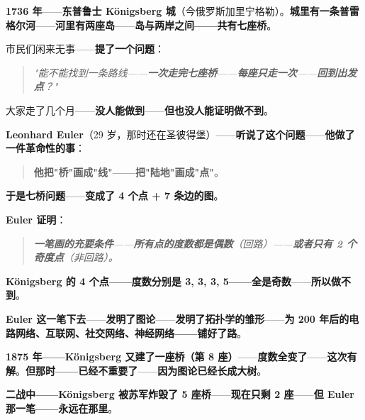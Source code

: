 \begin{tcolorbox}[storybox={\Large 小故事：Euler 与 Königsberg 七桥（1736）}]
\textbf{1736 年}——\textbf{东普鲁士 Königsberg 城}（今俄罗斯加里宁格勒）。\textbf{城里有一条普雷格尔河}——\textbf{河里有两座岛}——\textbf{岛与两岸之间——\textbf{共有七座桥}}。

\medskip

市民们闲来无事——\textbf{提了一个问题}：

\begin{quote}\itshape
"能不能找到一条路线——\textbf{一次走完七座桥}——\textbf{每座只走一次}——\textbf{回到出发点}？"
\end{quote}

大家走了几个月——\textbf{没人能做到}——\textbf{但也没人能证明做不到}。

\medskip

\textbf{Leonhard Euler}（29 岁，那时还在圣彼得堡）——\textbf{听说了这个问题}——\textbf{他做了一件革命性的事}：

\begin{quote}
\textbf{他把"桥"画成"线"——\textbf{把"陆地"画成"点"}}。
\end{quote}

\textbf{于是七桥问题}——\textbf{变成了 4 个点 + 7 条边的图}。

\medskip

\textbf{Euler 证明}：

\begin{quote}\itshape
\textbf{一笔画的充要条件}——\textbf{所有点的度数都是偶数}（回路）——\textbf{或者只有 2 个奇度点}（非回路）。
\end{quote}

\textbf{Königsberg 的 4 个点——\textbf{度数分别是 3, 3, 3, 5——\textbf{全是奇数}}}——\textbf{所以做不到}。

\medskip

\textbf{Euler 这一笔下去}——\textbf{发明了\textbf{图论}}——\textbf{发明了\textbf{拓扑学的雏形}}——\textbf{为 200 年后的\textbf{电路网络、互联网、社交网络、神经网络}——\textbf{铺好了路}}。

\medskip

\textbf{1875 年——Königsberg 又建了一座桥（第 8 座）}——\textbf{度数全变了}——\textbf{这次\textbf{有解}}。\textbf{但那时——\textbf{已经不重要了}}——\textbf{因为图论已经长成大树}。

\medskip

\textbf{二战中——\textbf{Königsberg 被苏军炸毁了 5 座桥}}——\textbf{现在只剩 2 座}——\textbf{但 Euler 那一笔——\textbf{永远在那里}}。
\end{tcolorbox}

